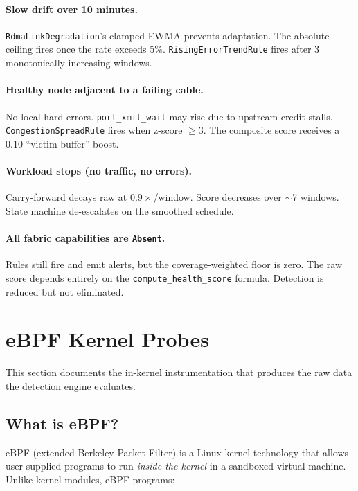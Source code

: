 \documentclass[11pt]{article}
\begin{document}
\paragraph{Slow drift over 10 minutes.}
\texttt{RdmaLinkDegradation}'s clamped EWMA prevents adaptation. The absolute
ceiling fires once the rate exceeds 5\%. \texttt{RisingErrorTrendRule} fires
after 3 monotonically increasing windows.

\paragraph{Healthy node adjacent to a failing cable.}
No local hard errors. \texttt{port\_xmit\_wait} may rise due to upstream
credit stalls. \texttt{CongestionSpreadRule} fires when z-score $\geq 3$.
The composite score receives a 0.10 ``victim buffer'' boost.

\paragraph{Workload stops (no traffic, no errors).}
Carry-forward decays raw at $0.9\times$/window. Score decreases over $\sim$7
windows. State machine de-escalates on the smoothed schedule.

\paragraph{All fabric capabilities are \texttt{Absent}.}
Rules still fire and emit alerts, but the coverage-weighted floor is zero.
The raw score depends entirely on the \texttt{compute\_health\_score}
formula. Detection is reduced but not eliminated.


\section{eBPF Kernel Probes}
\label{sec:ebpf}

This section documents the in-kernel instrumentation that produces the raw
data the detection engine evaluates.

\subsection{What is eBPF?}

eBPF (extended Berkeley Packet Filter) is a Linux kernel technology that
allows user-supplied programs to run \emph{inside the kernel} in a sandboxed
virtual machine. Unlike kernel modules, eBPF programs:
\end{document}
